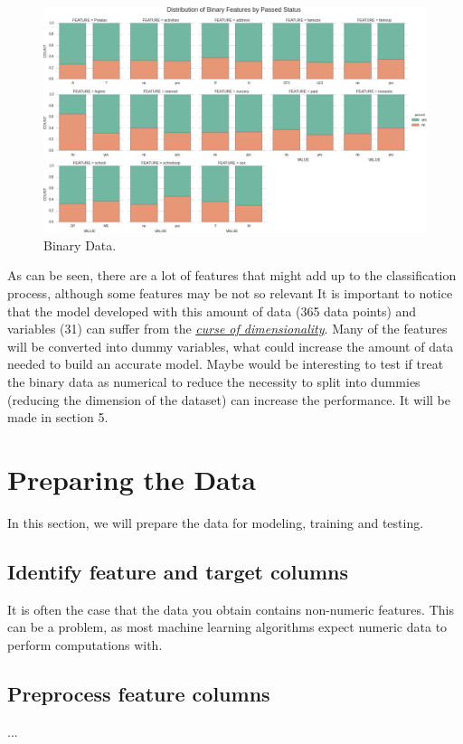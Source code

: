 \documentclass[a4paper]{article}
\begin{document}
\begin{figure}[ht]
\centering
\includegraphics[width=1\textwidth]{figures/binary/binary.png}
\caption{\label{fig:binary}Binary Data.}
\end{figure}


As can be seen, there are a lot of features that might add up to the classification process, although some features may be not so relevant It is important to notice that the model developed with this amount of data (365 data points) and variables (31) can suffer from the  \href{https://en.wikipedia.org/wiki/Curse_of_dimensionality}{\textit{curse of dimensionality}}. Many of the features will be converted into dummy variables, what could increase the amount of data needed to build an accurate model. Maybe would be interesting to test if treat the binary data as numerical to reduce the necessity to split into dummies (reducing the dimension of the dataset) can increase the performance. It will be made in section 5.

\section{Preparing the Data}
In this section, we will prepare the data for modeling, training and testing.
\subsection{Identify feature and target columns}
It is often the case that the data you obtain contains non-numeric features. This can be a problem, as most machine learning algorithms expect numeric data to perform computations with.


\subsection{Preprocess feature columns}
...
\end{document}
